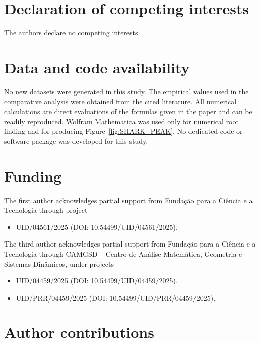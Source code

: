 \documentclass[11pt,a4paper]{amsart}
\begin{document}
%
%
%

\section*{Declaration of competing interests}

The authors declare no competing interests.

\section*{Data and code availability}

No new datasets were generated in this study. The empirical values used
in the comparative analysis were obtained from the cited literature.
All numerical calculations are direct evaluations of the formulas given
in the paper and can be readily reproduced. Wolfram Mathematica was used
only for numerical root finding and for producing Figure~\ref{fig:SHARK_PEAK}. No dedicated
code or software package was developed for this study.

\section*{Funding}

The first author acknowledges partial support from Fundação para a
Ciência e a Tecnologia through project \begin{itemize}
\item UID/04561/2025 (DOI: 10.54499/UID/04561/2025).
\end{itemize}

The third author acknowledges partial support from Fundação para a
Ciência e a Tecnologia through CAMGSD -- Centro de Análise Matemática,
Geometria e Sistemas Dinâmicos, under projects
\begin{itemize}
\item UID/04459/2025
(DOI: 10.54499/UID/04459/2025).
\item UID/PRR/04459/2025 
(DOI: 10.54499/UID/PRR/04459/2025).
\end{itemize}

\section*{Author contributions}
\end{document}
